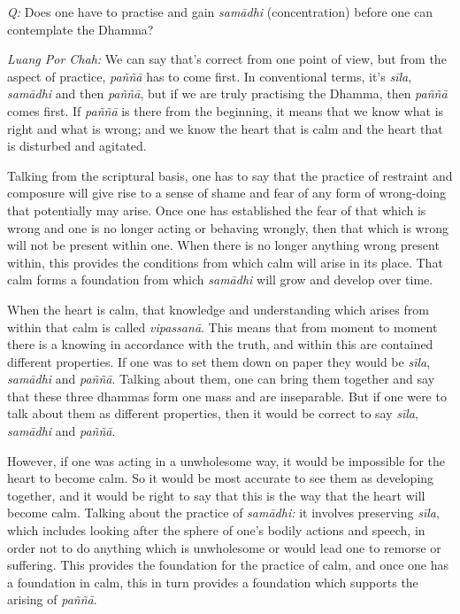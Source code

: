 
\emph{Q:} Does one have to practise and gain \emph{samādhi} (concentration) before one
can contemplate the Dhamma?

\emph{Luang Por Chah:} We can say that's correct from one point of view,
but from the aspect of practice, \emph{paññā} has to come first. In
conventional terms, it's \emph{sīla}, \emph{samādhi} and then
\emph{paññā}, but if we are truly practising the Dhamma, then
\emph{paññā} comes first. If \emph{paññā} is there from the beginning, 
it means that we know what is right and what is wrong; and we know the
heart that is calm and the heart that is disturbed and agitated. 

Talking from the scriptural basis, one has to say that the practice of
restraint and composure will give rise to a sense of shame and fear of
any form of wrong-doing that potentially may arise. Once one has
established the fear of that which is wrong and one is no longer acting
or behaving wrongly, then that which is wrong will not be present within
one. When there is no longer anything wrong present within, this
provides the conditions from which calm will arise in its place. That
calm forms a foundation from which \emph{samādhi} will grow and develop over
time. 

When the heart is calm, that knowledge and understanding which arises
from within that calm is called \emph{vipassanā}. This means that from
moment to moment there is a knowing in accordance with the truth, and
within this are contained different properties. If one was to set them
down on paper they would be \emph{sīla}, \emph{samādhi} and
\emph{paññā}. Talking about them, one can bring them together and say
that these three dhammas form one mass and are inseparable. But if one
were to talk about them as different properties, then it would be
correct to say \emph{sīla}, \emph{samādhi} and \emph{paññā}. 

However, if one was acting in a unwholesome way, it would be impossible
for the heart to become calm. So it would be most accurate to see them
as developing together, and it would be right to say that this is the
way that the heart will become calm. Talking about the practice of
\emph{samādhi:} it involves preserving \emph{sīla}, which includes
looking after the sphere of one's bodily actions and speech, in order
not to do anything which is unwholesome or would lead one to remorse or
suffering. This provides the foundation for the practice of calm, and
once one has a foundation in calm, this in turn provides a foundation
which supports the arising of \emph{paññā}. 


